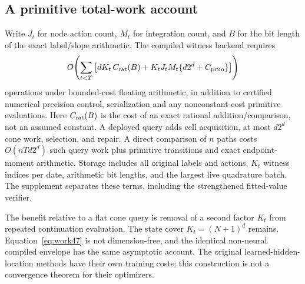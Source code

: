 \subsection{A primitive total-work account}
Write $J_t$ for node action count, $M_t$ for integration count, and $B$ for the bit length of the exact label/slope arithmetic. The compiled witness backend requires
\begin{equation}\label{eq:work47}
 O\!\left(\sum_{t<T}\left[dK_t\,C_{\rm rat}(B)
       +K_tJ_tM_t\{d2^d+C_{\rm prim}\}\right]\right)
\end{equation}
operations under bounded-cost floating arithmetic, in addition to certified numerical precision control, serialization and any nonconstant-cost primitive evaluations. Here $C_{\rm rat}(B)$ is the cost of an exact rational addition/comparison, not an assumed constant. A deployed query adds cell acquisition, at most $d2^d$ cone work, selection, and repair. A direct comparison of $n$ paths costs $O(nTd2^d)$ such query work plus primitive transitions and exact endpoint-moment arithmetic. Storage includes all original labels and actions, $K_t$ witness indices per date, arithmetic bit lengths, and the largest live quadrature batch. The supplement separates these terms, including the strengthened fitted-value verifier.

The benefit relative to a flat cone query is removal of a second factor $K_t$ from repeated continuation evaluation. The state cover $K_t=(N+1)^d$ remains. Equation~\eqref{eq:work47} is not dimension-free, and the identical non-neural compiled envelope has the same asymptotic account. The original learned-hidden-location methods have their own training costs; this construction is not a convergence theorem for their optimizers.
